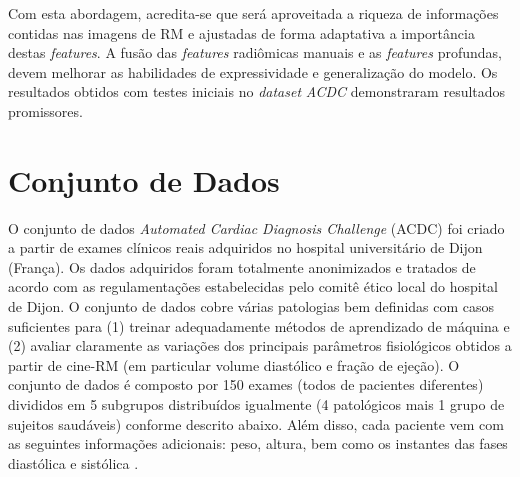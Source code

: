 Com esta abordagem, acredita-se que será aproveitada a riqueza de informações contidas nas imagens de RM e ajustadas de forma adaptativa a importância destas \textit{features}. A fusão das \textit{features} radiômicas manuais e as \textit{features} profundas, devem melhorar as habilidades de expressividade e generalização do modelo. Os resultados obtidos com testes iniciais no \textit{dataset} \textit{ACDC} demonstraram resultados promissores.

\section{Conjunto de Dados} \label{sec:conj_dados}

O conjunto de dados \textit{Automated Cardiac Diagnosis Challenge} (ACDC) foi criado a partir de exames clínicos reais adquiridos no hospital universitário de Dijon (França). Os dados adquiridos foram totalmente anonimizados e tratados de acordo com as regulamentações estabelecidas pelo comitê ético local do hospital de Dijon. O conjunto de dados cobre várias patologias bem definidas com casos suficientes para (1) treinar adequadamente métodos de aprendizado de máquina e (2) avaliar claramente as variações dos principais parâmetros fisiológicos obtidos a partir de cine-RM (em particular volume diastólico e fração de ejeção). O conjunto de dados é composto por 150 exames (todos de pacientes diferentes) divididos em 5 subgrupos distribuídos igualmente (4 patológicos mais 1 grupo de sujeitos saudáveis) conforme descrito abaixo. Além disso, cada paciente vem com as seguintes informações adicionais: peso, altura, bem como os instantes das fases diastólica e sistólica \cite{bernardDeepLearningTechniques2018a}.